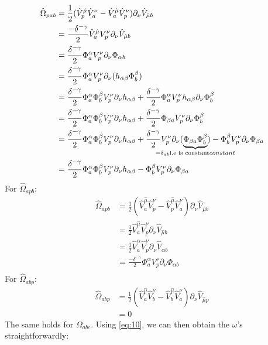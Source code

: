 \documentclass{article}
\begin{document}
\begin{align*}
    \hat \Omega_{pab} &= \frac{1}{2}(\hat V^{\hat \mu}_{  p} \hat V^{ \nu}_{a}-\hat V^{\hat \mu}_{a} \hat V^{ \nu}_{p})\partial_{ \nu} \hat V_{\hat \mu b}\\
    &= \frac{-\delta^{-\gamma}}{2}\hat V^{\hat \mu}_{a}  V^{ \nu}_{p}\partial_{ \nu} \hat V_{\hat \mu b}\\
    &= \frac{\delta^{-\gamma}}{2} \Phi^{ \alpha}_{a}  V^{ \nu}_{p}\partial_{ \nu}  \Phi_{\alpha b}\\
    &= \frac{\delta^{-\gamma}}{2} \Phi^{ \alpha}_{a}  V^{ \nu}_{p}\partial_{ \nu}( h_{\alpha \beta} \Phi^{\beta}_{ b})\\
    &= \frac{\delta^{-\gamma}}{2} \Phi^{ \alpha}_{a}  \Phi^{\beta}_{ b}V^{ \nu}_{p}\partial_{ \nu} h_{\alpha \beta}  +\frac{\delta^{-\gamma}}{2} \Phi^{ \alpha}_{a}  V^{ \nu}_{p}h_{\alpha \beta}\partial_{ \nu}  \Phi^{\beta}_{ b}\\
    &= \frac{\delta^{-\gamma}}{2} \Phi^{ \alpha}_{a}  \Phi^{\beta}_{ b}V^{ \nu}_{p}\partial_{ \nu} h_{\alpha \beta}  +\frac{\delta^{-\gamma}}{2} \Phi_{\beta a}  V^{ \nu}_{p}\partial_{ \nu}  \Phi^{\beta}_{ b}\\
    &= \frac{\delta^{-\gamma}}{2} \Phi^{ \alpha}_{a}  \Phi^{\beta}_{ b}V^{ \nu}_{p}\partial_{ \nu} h_{\alpha \beta}  +\frac{\delta^{-\gamma}}{2}   V^{ \nu}_{p}\partial_{ \nu} (\underbrace{\Phi_{\beta a} \Phi^{\beta}_{ b}}_{\mathclap{ =\delta_{ab} \text{i.e is constant} constant}}) - \Phi^{\beta}_{ b} V^{ \nu}_{p}\partial_{ \nu} \Phi_{\beta a} \\
    &=\frac{\delta^{-\gamma}}{2} \Phi^{ \alpha}_{a}  \Phi^{\beta}_{ b}V^{ \nu}_{p}\partial_{ \nu} h_{\alpha \beta} - \Phi^{\beta}_{ b} V^{ \nu}_{p}\partial_{ \nu} \Phi_{\beta a} 
\end{align*}
For $\hat \Omega_{apb}$:
\begin{align*}
    \hat \Omega_{apb} &= \frac{1}{2}(\hat V^{\hat \mu}_{  a} \hat V^{ \nu}_{p}-\hat V^{\hat \mu}_{p} \hat V^{ \nu}_{a})\partial_{ \nu} \hat V_{\hat \mu b}\\
    &= \frac{1}{2}\hat V^{\hat \mu}_{  a} \hat V^{ \nu}_{p}\partial_{ \nu} \hat V_{\hat \mu b}\\
    &= \frac{1}{2}\hat V^{\alpha}_{  a} \hat V^{ \nu}_{p}\partial_{ \nu} \hat V_{\alpha b}\\
    &= \frac{-\delta^{-\gamma}}{2} \Phi^{\alpha}_{  a}  V^{ \nu}_{p}\partial_{ \nu} \Phi_{\alpha b}\\
\end{align*}
For $\hat \Omega_{abp}$:
\begin{align*}
    \hat \Omega_{abp} &= \frac{1}{2}(\hat V^{\hat \mu}_{  a} \hat V^{ \nu}_{b}-\hat V^{\hat \mu}_{b} \hat V^{ \nu}_{a})\partial_{ \nu} \hat V_{\hat \mu p}\\
    &= 0
\end{align*}
The same holds for $\Omega_{abc}$. Using \eqref{eq:10}, we can then obtain the $\omega$'s straightforwardly:
\end{document}
